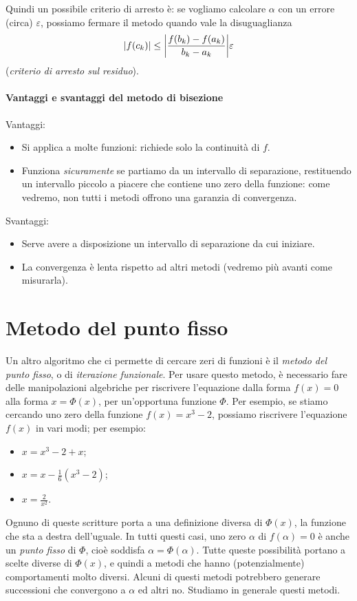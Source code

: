 \documentclass[a4paper]{report}
\DeclarePairedDelimiter{\abs}{\lvert}{\rvert}
\theoremstyle{definiton}
\theoremstyle{remark}
\begin{document}
Quindi un possibile criterio di arresto è: se vogliamo calcolare $\alpha$ con un errore (circa) $\varepsilon$, possiamo fermare il metodo quando vale la disuguaglianza 
\[
\abs{f(c_k)} \leq \abs*{\frac{f(b_k) - f(a_k)}{b_k-a_k}} \varepsilon
\]
(\emph{criterio di arresto sul residuo}).

\paragraph{Vantaggi e svantaggi del metodo di bisezione}

Vantaggi:

\begin{itemize}
    \item Si applica a molte funzioni: richiede solo la continuità di $f$.
    \item Funziona \emph{sicuramente} se partiamo da un intervallo di separazione, restituendo un intervallo piccolo a piacere che contiene uno zero della funzione: come vedremo, non tutti i metodi offrono una garanzia di convergenza.
\end{itemize}

Svantaggi:

\begin{itemize}
    \item Serve avere a disposizione un intervallo di separazione da cui iniziare.
    \item La convergenza è lenta rispetto ad altri metodi (vedremo più avanti come misurarla).
\end{itemize}


\section{Metodo del punto fisso}

Un altro algoritmo che ci permette di cercare zeri di funzioni è il \emph{metodo del punto fisso}, o di \emph{iterazione funzionale}. Per usare questo metodo, è necessario fare delle manipolazioni algebriche per riscrivere l'equazione dalla forma $f(x) = 0$ alla forma $x = \Phi(x)$, per un'opportuna funzione $\Phi$. Per esempio, se stiamo cercando uno zero della funzione $f(x) = x^3 - 2$, possiamo riscrivere l'equazione $f(x)$ in vari modi; per esempio: 
\begin{itemize}
    \item $x = x^3 - 2 + x$;
    \item $x = x - \frac16 (x^3-2)$;
    \item $x = \frac{2}{x^2}$.
\end{itemize}
Ognuno di queste scritture porta a una definizione diversa di $\Phi(x)$, la funzione che sta a destra dell'uguale. In tutti questi casi, uno zero $\alpha$ di $f(\alpha)=0$ è anche un \emph{punto fisso} di $\Phi$, cioè soddisfa $\alpha = \Phi(\alpha)$. Tutte queste possibilità portano a scelte diverse di $\Phi(x)$, e quindi a metodi che hanno (potenzialmente) comportamenti molto diversi. Alcuni di questi metodi potrebbero generare successioni che convergono a $\alpha$ ed altri no. Studiamo in generale questi metodi.
\end{document}
